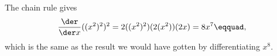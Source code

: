 The chain rule gives
\begin{equation*}
  \frac{\der}{\der x} ((x^2)^2)^2 = 2((x^2)^2)(2(x^2))(2x) = 8x^7\eqquad,
\end{equation*}
which is the same as the result we would have gotten by differentiating $x^8$.
